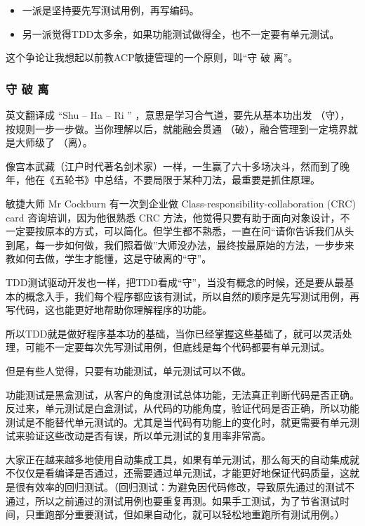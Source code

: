 \begin{itemize}
\tightlist
\item
  一派是坚持要先写测试用例，再写编码。
\item
  另一派觉得TDD太多余，如果功能测试做得全，也不一定要有单元测试。
\end{itemize}

这个争论让我想起以前教ACP敏捷管理的一个原则，叫``守 破 离''。

\hypertarget{ux5b88-ux7834-ux79bb}{%
\subsubsection{守 破 离}\label{ux5b88-ux7834-ux79bb}}

英文翻译成 ``Shu -- Ha -- Ri '' ，意思是学习合气道，要先从基本功出发
（守），按规则一步一步做。当你理解以后，就能融会贯通
（破），融合管理到一定境界就是大师级了 （离）。

像宫本武藏（江户时代著名剑术家）一样，一生赢了六十多场决斗，然而到了晚年，他在《五轮书》中总结，不要局限于某种刀法，最重要是抓住原理。

敏捷大师 Mr Cockburn 有一次到企业做 Class-responsibility-collaboration
(CRC) card 咨询培训，因为他很熟悉 CRC
方法，他觉得只要有助于面向对象设计，不一定要按原本的方式，可以简化。但学生都不熟悉，一直在问``请你告诉我们从头到尾，每一步如何做，我们照着做''大师没办法，最终按最原始的方法，一步步来教如何去做，学生才能懂，这是守破离的``守''。

TDD测试驱动开发也一样，把TDD看成``守''，当没有概念的时候，还是要从最基本的概念入手，我们每个程序都应该有测试，所以自然的顺序是先写测试用例，再写代码，这也能更好地帮助你理解程序的功能。

所以TDD就是做好程序基本功的基础，当你已经掌握这些基础了，就可以灵活处理，可能不一定要每次先写测试用例，但底线是每个代码都要有单元测试。

但是有些人觉得，只要有功能测试，单元测试可以不做。

功能测试是黑盒测试，从客户的角度测试总体功能，无法真正判断代码是否正确。反过来，单元测试是白盒测试，从代码的功能角度，验证代码是否正确，所以功能测试是不能替代单元测试的。尤其是当代码有功能上的变化时，就更需要有单元测试来验证这些改动是否有误，所以单元测试的复用率非常高。

大家正在越来越多地使用自动集成工具，如果有单元测试，那么每天的自动集成就不仅仅是看编译是否通过，还需要通过单元测试，才能更好地保证代码质量，这就是很有效率的回归测试。（回归测试：为避免因代码修改，导致原先通过的测试不通过，所以之前通过的测试用例也要重复再测。如果手工测试，为了节省测试时间，只重跑部分重要测试，但如果自动化，就可以轻松地重跑所有测试用例。）

